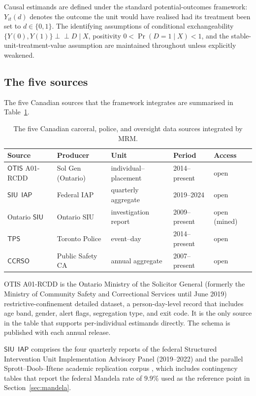 \documentclass[article,shortnames,nojss]{jss}
\newcommand{\indep}{\perp\!\!\!\perp}
\newcommand{\OTIS}{\textsf{OTIS}}
\newcommand{\SIU}{\textsf{SIU}}
\newcommand{\TPS}{\textsf{TPS}}
\newcommand{\CCRSO}{\textsf{CCRSO}}
\newcommand{\IAP}{\textsf{IAP}}
\begin{document}
Causal estimands are defined under the standard potential-outcomes
framework: $Y_{it}(d)$ denotes the outcome the unit would have
realised had its treatment been set to $d \in \{0,1\}$. The
identifying assumptions of conditional exchangeability
$\{Y(0), Y(1)\} \indep D \mid X$, positivity $0 < \Pr(D=1 \mid X) <
1$, and the stable-unit-treatment-value assumption are maintained
throughout unless explicitly weakened.

\subsection{The five sources}

The five Canadian sources that the framework integrates are
summarised in Table~\ref{tab:sources}.

\begin{table}[h]
\centering
\caption{The five Canadian carceral, police, and oversight data
sources integrated by MRM.}
\label{tab:sources}
\begin{tabular}{lllll}
\toprule
Source & Producer & Unit & Period & Access \\
\midrule
$\OTIS$ A01-RCDD & Sol Gen (Ontario) & individual--placement & 2014--present & open \\
$\SIU$~$\IAP$    & Federal IAP     & quarterly aggregate   & 2019--2024     & open \\
Ontario $\SIU$   & Ontario SIU     & investigation report   & 2009--present & open (mined) \\
$\TPS$           & Toronto Police   & event--day            & 2014--present & open \\
$\CCRSO$         & Public Safety CA & annual aggregate      & 2007--present & open \\
\bottomrule
\end{tabular}
\end{table}

\OTIS{} A01-RCDD is the Ontario Ministry of the Solicitor General (formerly the
Ministry of Community Safety and Correctional Services until June 2019) restrictive-confinement detailed dataset, a
person-day-level record that includes age band, gender, alert
flags, segregation type, and exit code. It is the only source in
the table that supports per-individual estimands directly. The
schema is published with each annual release.

$\SIU$~$\IAP$ comprises the four quarterly reports of the federal
Structured Intervention Unit Implementation Advisory Panel
(2019--2022) and the parallel Sprott--Doob--Iftene academic
replication corpus \citep{SprottDoob2023, SprottDoobIftene2021}, which
includes contingency tables that report the federal Mandela rate
of $9.9\%$ used as the reference point in
Section~\ref{sec:mandela}.
\end{document}
